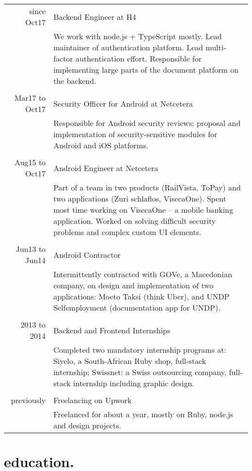 \documentclass[a4paper,notitlepage]{report}
\begin{document}
\begin{tabular}{r | p{10cm} }

since Oct17 & Backend Engineer at H4 \\
            & We work with node.js + TypeScript mostly. Lead maintainer of
            authentication platform. Lead multi-factor authentication effort.
            Responsible for implementing large parts of the document platform
            on the backend. \\ \\
Mar17 to 
Oct17       & Security Officer for Android at Netcetera \\
            & Responsible for Android security reviews; proposal and
            implementation of security-sensitive modules for Android and iOS
            platforms. \\ \\
Aug15 to
Oct17       & Android Engineer at Netcetera \\
            & Part of a team in two products (RailVista, ToPay) and two
            applications (Zuri schlaflos, VisecaOne). Spent most time working
            on VisecaOne -- a mobile banking application. Worked on solving
            difficult security problems and complex custom UI elements. \\ \\
Jun13 to
Jun14       & Android Contractor \\
            & Intermittently contracted with GOVe, a Macedonian company, on
            design and implementation of two applications: Moeto Taksi (think
            Uber), and UNDP Selfemployment (documentation app for UNDP). \\ \\

2013 to
2014       & Backend and Frontend Internships \\
           & Completed two mandatory internship programs at: Siyelo, a
           South-African Ruby shop, full-stack internship; Swissnet: a Swiss
           outsourcing company, full-stack internship including graphic design.
           \\ \\

previously & Freelancing on Upwork \\
           & Freelanced for about a year, mostly on Ruby, node.js and design
           projects.

\end{tabular}

\section*{education.}
\end{document}
